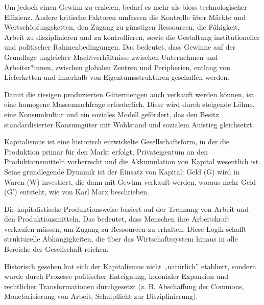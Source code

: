 \documentclass[
  nswissgerman,
  a4paper,
  openany]{book}
\begin{document}
Um jedoch einen Gewinn zu erzielen, bedarf es mehr als bloss
technologischer Effizienz. Andere kritische Faktoren umfassen die
Kontrolle über Märkte und Wertschöpfungsketten, den Zugang zu günstigen
Ressourcen, die Fähigkeit, Arbeit zu disziplinieren und zu
kontrollieren, sowie die Gestaltung institutioneller und politischer
Rahmenbedingungen. Das bedeutet, dass Gewinne auf der Grundlage
ungleicher Machtverhältnisse zwischen Unternehmen und Arbeiter*innen,
zwischen globalen Zentren und Peripherien, entlang von Lieferketten und
innerhalb von Eigentumsstrukturen geschaffen werden.

Damit die riesigen produzierten Gütermengen auch verkauft werden können,
ist eine homogene Massennachfrage erforderlich. Diese wird durch
steigende Löhne, eine Konsumkultur und ein soziales Modell gefördert,
das den Besitz standardisierter Konsumgüter mit Wohlstand und sozialem
Aufstieg gleichsetzt.

\begin{tcolorbox}[enhanced jigsaw, arc=.35mm, bottomrule=.15mm, bottomtitle=1mm, breakable, colback=white, colbacktitle=quarto-callout-note-color!10!white, colframe=quarto-callout-note-color-frame, coltitle=black, left=2mm, leftrule=.75mm, opacityback=0, opacitybacktitle=0.6, rightrule=.15mm, title={Was ist Kapitalismus?}, titlerule=0mm, toprule=.15mm, toptitle=1mm]

Kapitalismus ist eine historisch entwickelte Gesellschaftsform, in der
die Produktion primär für den Markt erfolgt, Privateigentum an den
Produktionsmitteln vorherrscht und die Akkumulation von Kapital
wesentlich ist. Seine grundlegende Dynamik ist der Einsatz von Kapital:
Geld (G) wird in Waren (W) investiert, die dann mit Gewinn verkauft
werden, woraus mehr Geld (G') entsteht, wie von Karl Marx beschrieben.

Die kapitalistische Produktionsweise basiert auf der Trennung von Arbeit
und den Produktionsmitteln. Das bedeutet, dass Menschen ihre
Arbeitskraft verkaufen müssen, um Zugang zu Ressourcen zu erhalten.
Diese Logik schafft strukturelle Abhängigkeiten, die über das
Wirtschaftssystem hinaus in alle Bereiche der Gesellschaft reichen.

Historisch gesehen hat sich der Kapitalismus nicht „natürlich''
etabliert, sondern wurde durch Prozesse politischer Enteignung,
kolonialer Expansion und rechtlicher Transformationen durchgesetzt (z.
B. Abschaffung der Commons, Monetarisierung von Arbeit, Schulpflicht zur
Disziplinierung).

\end{tcolorbox}
\end{document}

